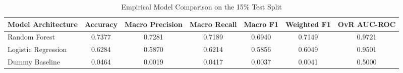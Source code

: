 \begin{table}
\caption{Empirical Model Comparison on the 15\% Test Split}
\label{tab:model_comparison}
\begin{tabular}{lcccccc}
\toprule
Model Architecture & Accuracy & Macro Precision & Macro Recall & Macro F1 & Weighted F1 & OvR AUC-ROC \\
\midrule
Random Forest & 0.7377 & 0.7281 & 0.7189 & 0.6940 & 0.7149 & 0.9721 \\
Logistic Regression & 0.6284 & 0.5870 & 0.6214 & 0.5856 & 0.6049 & 0.9501 \\
Dummy Baseline & 0.0464 & 0.0019 & 0.0417 & 0.0037 & 0.0041 & 0.5000 \\
\bottomrule
\end{tabular}
\end{table}
